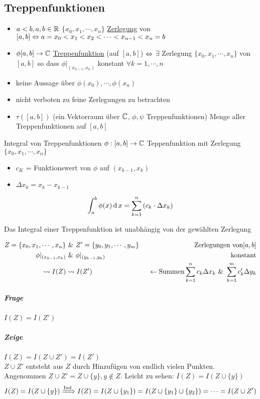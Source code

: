 \subsection{Treppenfunktionen}
\begin{itemize}
  \item $a<b, a,b\in\mathbb{R}$ $\{x_0,x_1,\cdots,x_n\}$ \underline{Zerlegung} von $[a,b] \Leftrightarrow a=x_0<x_1<x_2<\cdots<x_{n-1}<x_n = b$
  \item $\phi[a,b]\to\mathbb{C}$ \underline{Treppenfunktion} (auf $[a,b]$) $\Leftrightarrow$ $\exists$ Zerlegung $\{x_0,x_1,\cdots,x_n\}$ von $[a,b]$ so dass $\phi|_{(x_{n-1},x_n)}$ konstant $\forall k=1,\cdots,n$
\end{itemize}
\begin{Bem}
  \begin{itemize}
    \item keine Aussage über $\phi(x_0),\cdots,\phi(x_n)$
    \item nicht verboten zu feine Zerlegungen zu betrachten
  \end{itemize}
\end{Bem}
\begin{itemize}
  \item $\tau([a,b])$ (ein Vektorraum über $\mathbb{C}$, $\phi, \psi$ Treppenfunktionen) Menge aller Treppenfunktionen auf $[a,b]$
\end{itemize}
\begin{Def}{Integral von Treppenfunktionen} $\phi:[a,b]\to\mathbb{C}$ Teppenfunktion mit Zerlegung $\{x_0,x_1,\cdots,x_n\}$
  \begin{itemize}
    \item $c_K$ = Funktionswert von $\phi$ auf $(x_{k-1},x_k)$
    \item $\Delta x_k=x_k-x_{k-1}$
  \end{itemize}
  \[\int_a^b \phi(x)\operatorname{d} x=\sum^n_{k=1}\left( c_k\cdot\Delta x_k \right)\]
\end{Def}
\begin{Lem}{}
  Das Integral einer Treppenfunktion ist unabhängig von der gewählten Zerlegung
\end{Lem}
\begin{Bew}{}
  \begin{align*}
    Z=\{x_0,x_1,\cdots,x_n\} &\ \&\  Z'= \{y_0,y_1,\cdots,y_m\} & \text{Zerlegungen von} [a,b]\\
    \phi|_{(x_{k-1},x_k)} &\ \&\  \phi|_{(y_{k-1},y_k)} & \text{konstant}\\
    \rightsquigarrow I(Z) & \rightsquigarrow I(Z') &\ \ \leftarrow \text{Summen} \sum^n_{k=1}c_k\Delta x_k \ \&\ \sum^m_{k=1}c'_k\Delta y_k
  \end{align*}
  \subparagraph{Frage} $I(Z)=I(Z')$
  \subparagraph{Zeige} $I(Z)=I(Z\cup Z')=I(Z')$\\
  $Z\cup Z'$ entsteht aus $Z$ durch Hinzufügen von endlich vielen Punkten.\\
  Angenommen $Z\cup Z' = Z\cup\{y\}, y\not\in Z$. Leicht zu sehen: $I(Z)=I(Z\cup\{y\})$
  \begin{align*}
    I(Z)=I(Z\cup\{y\})\xRightarrow{\text{Ind}} I(Z) = I(Z\cup\{y_1\})=I(Z\cup \{y_1\}\cup\{y_2\}) = \cdots = I(Z\cup Z')
  \end{align*}
\end{Bew}
